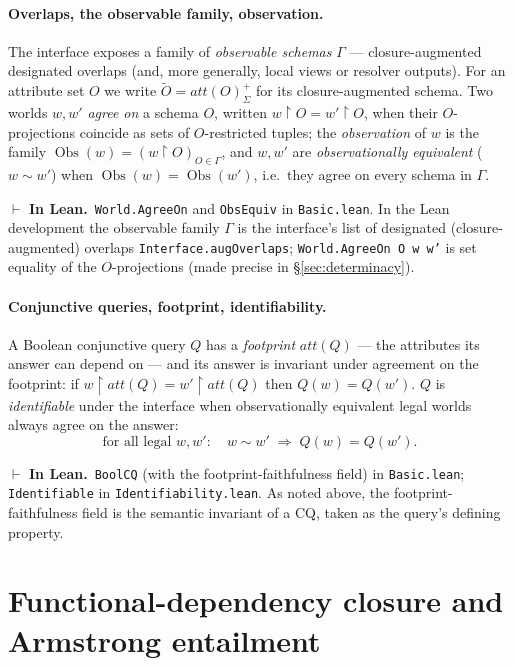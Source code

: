 \documentclass[11pt]{article}
\newcommand{\att}[1]{\mathit{att}(#1)}
\newcommand{\cq}{CQ}
\newcommand{\clo}[1]{{#1}^{+}_{\Sigma}}      %
\newcommand{\aug}[1]{\widetilde{#1}}         %
\newcommand{\ObsFam}{\Gamma}                 %
\newcommand{\Obs}{\operatorname{Obs}}        %
\newcommand{\proj}[2]{#1{\restriction}#2}    %
\newcommand{\lean}[1]{\texttt{#1}}           %
\theoremstyle{plain}
\theoremstyle{definition}
\newcommand{\inlean}[1]{\par\smallskip\noindent%
  {\small\textcolor{blue!50!black}{$\vdash$ \textbf{In Lean.}}~#1}\par\smallskip}
\begin{document}
\paragraph{Overlaps, the observable family, observation.}
The interface exposes a family of \emph{observable schemas} $\ObsFam$ --- closure-augmented
designated overlaps (and, more generally, local views or resolver outputs). For an attribute
set $O$ we write $\aug O = \clo{\att O}$ for its closure-augmented schema. Two worlds $w,w'$
\emph{agree on} a schema $O$, written $\proj w O = \proj{w'} O$, when their $O$-projections
coincide as sets of $O$-restricted tuples; the \emph{observation} of $w$ is the family
$\Obs(w)=(\proj w O)_{O\in\ObsFam}$, and $w,w'$ are \emph{observationally equivalent}
($w\sim w'$) when $\Obs(w)=\Obs(w')$, i.e.\ they agree on every schema in $\ObsFam$.
\inlean{\lean{World.AgreeOn} and \lean{ObsEquiv} in \lean{Basic.lean}. In the Lean
development the observable family $\ObsFam$ is the interface's list of designated
(closure-augmented) overlaps \lean{Interface.augOverlaps}; \lean{World.AgreeOn O w w'} is set
equality of the $O$-projections (made precise in \S\ref{sec:determinacy}).}

\paragraph{Conjunctive queries, footprint, identifiability.}
A Boolean conjunctive query $Q$ has a \emph{footprint} $\att Q$ --- the attributes its answer
can depend on --- and its answer is invariant under agreement on the footprint: if
$\proj w{\att Q}=\proj{w'}{\att Q}$ then $Q(w)=Q(w')$. $Q$ is \emph{identifiable} under the
interface when observationally equivalent legal worlds always agree on the answer:
\[
  \text{for all legal } w,w':\quad w\sim w' \;\Longrightarrow\; Q(w)=Q(w').
\]
\inlean{\lean{BoolCQ} (with the footprint-faithfulness field) in \lean{Basic.lean};
\lean{Identifiable} in \lean{Identifiability.lean}. As noted above, the footprint-faithfulness
field is the semantic invariant of a \cq, taken as the query's defining property.}

\section{Functional-dependency closure and Armstrong entailment}\label{sec:fd}
\end{document}
